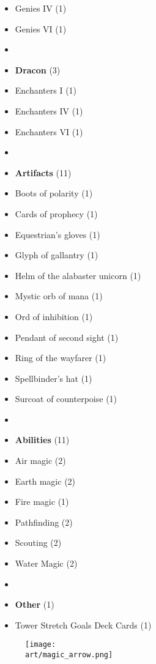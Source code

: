 \begin{multicols}{3}
\begin{itemize}[leftmargin=0pt, label={}, noitemsep]
  \item Genies IV (1)
  \item Genies VI (1)
  \item
  \item \textbf{Dracon} (3)
  \item Enchanters I (1)
  \item Enchanters IV (1)
  \item Enchanters VI (1)
  \item
  \item \textbf{Artifacts} (11)
  \item Boots of polarity (1)
  \item Cards of prophecy (1)
  \item Equestrian's gloves (1)
  \item Glyph of gallantry (1)
  \item Helm of the alabaster unicorn (1)
  \item Mystic orb of mana (1)
  \item Ord of inhibition (1)
  \item Pendant of second sight (1)
  \item Ring of the wayfarer (1)
  \item Spellbinder's hat (1)
  \item Surcoat of counterpoise (1)
  \item
  \item \textbf{Abilities} (11)
  \item Air magic (2)
  \item Earth magic (2)
  \item Fire magic (1)
  \item Pathfinding (2)
  \item Scouting (2)
  \item Water Magic (2)
  \item
  \item \textbf{Other} (1)
  \item Tower Stretch Goals Deck Cards (1)
\end{itemize}

\end{multicols}

\vfill
\begin{figure*}[!hb]
  \centering
  \texttt{[image: \\art/magic\_arrow.png]}
\end{figure*}
\vfill
